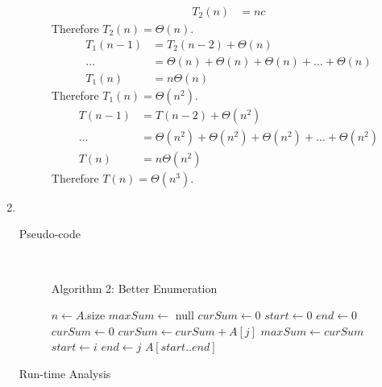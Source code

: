 \documentclass[paper=a4, fontsize=11pt]{scrartcl} %
\numberwithin{equation}{section} %
\numberwithin{figure}{section} %
\numberwithin{table}{section} %
\begin{document}
\begin{enumerate}[label=\bfseries Algorithm \arabic*:]
\begin{description}
\begin{align*}
            T_2(n) & = nc
        \end{align*}
        Therefore $T_2(n) = \Theta(n)$.
        \begin{align*}
            T_1(n - 1) & = T_2(n - 2) + \Theta(n) \\
            \ldots & = \Theta(n) + \Theta(n) + \Theta(n) + \ldots + \Theta(n) \\
            T_1(n) & = n\Theta(n)
        \end{align*}
        Therefore $T_1(n) = \Theta(n^2)$.
        \begin{align*}
            T(n - 1) & = T(n - 2) + \Theta(n^2) \\
            \ldots & = \Theta(n^2) + \Theta(n^2) + \Theta(n^2) + \ldots + \Theta(n^2) \\
            T(n) & = n\Theta(n^2)
        \end{align*}
        Therefore $T(n) = \Theta(n^3)$.
    \end{description}

    \item \hfill \\
    \begin{description}
        \item[Pseudo-code] \hfill \\
        \begin{algorithmc}
            \caption{Algorithm 2: Better Enumeration}
                \State $n \gets A$.size
                \State $maxSum \gets$ null
                \State $curSum \gets 0$
                \State $start \gets 0$
                \State $end \gets 0$
                    \State $curSum \gets 0$
                        \State $curSum \gets curSum + A[j]$
                            \State $maxSum \gets curSum$
                            \State $start \gets i$
                            \State $end \gets j$
                        \EndIf
                    \EndFor
                \EndFor
                \State \Return $A[start..end]$
            \EndFunction
        \end{algorithmc}
        \item[Run-time Analysis] \hfill \\
    \end{description}


\end{enumerate}
\end{document}
